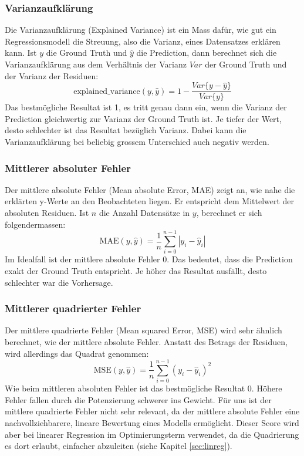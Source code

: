 \documentclass[10pt, a4paper]{article}
\begin{document}
\subsubsection{Varianzaufklärung}
Die Varianzaufklärung (Explained Variance) ist ein Mass dafür, wie gut ein Regressionsmodell die Streuung, also die Varianz, eines Datensatzes erklären kann.
Ist \(y\) die Ground Truth und \(\hat{y}\) die Prediction, dann berechnet sich die Varianzaufklärung aus dem Verhältnis der Varianz \(Var\) der Ground Truth und der Varianz der Residuen: 
\[
\text{explained\_variance}(y, \hat{y}) = 1 - 
\frac{Var\{y - \hat{y}\}}
{Var\{y\}}
\]
Das bestmögliche Resultat ist 1, es tritt genau dann ein, wenn die Varianz der Prediction gleichwertig zur Varianz der Ground Truth ist. Je tiefer der Wert, desto schlechter ist das Resultat bezüglich Varianz. Dabei kann die Varianzaufklärung bei beliebig grossem Unterschied auch negativ werden.

\subsubsection{Mittlerer absoluter Fehler}
Der mittlere absolute Fehler (Mean absolute Error, MAE) zeigt an, wie nahe die erklärten y-Werte an den Beobachteten liegen. Er entspricht dem Mittelwert der absoluten Residuen. Ist \(n\) die Anzahl Datensätze in \(y\), berechnet er sich folgendermassen:
\[
\text{MAE}(y, \hat{y}) = \frac{1}{n}  \sum_{i=0}^{n-1} |y_i - \hat{y}_i|
\]
Im Idealfall ist der mittlere absolute Fehler 0. Das bedeutet, dass die Prediction exakt der Ground Truth entspricht. Je höher das Resultat ausfällt, desto schlechter war die Vorhersage.

\subsubsection{Mittlerer quadrierter Fehler}
Der mittlere quadrierte Fehler (Mean squared Error, MSE) wird sehr ähnlich berechnet, wie der mittlere absolute Fehler. Anstatt des Betrags der Residuen, wird allerdings das Quadrat genommen:
\[
\text{MSE}(y, \hat{y}) = \frac{1}{n}  \sum_{i=0}^{n-1} (y_i - \hat{y}_i)^2
\]
Wie beim mittleren absoluten Fehler ist das bestmögliche Resultat 0. Höhere Fehler fallen durch die Potenzierung schwerer ins Gewicht. Für uns ist der mittlere quadrierte Fehler nicht sehr relevant, da der mittlere absolute Fehler eine nachvollziehbarere, lineare Bewertung eines Modells ermöglicht. Dieser Score wird aber bei linearer Regression im Optimierungsterm verwendet, da die Quadrierung  es dort erlaubt, einfacher abzuleiten (siehe Kapitel \ref{sec:linreg}).
\end{document}
